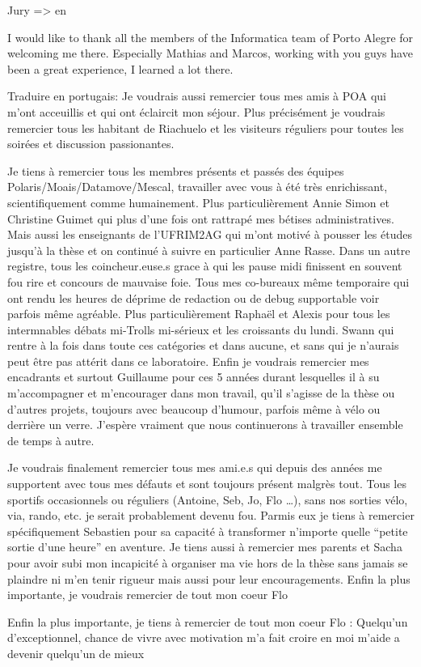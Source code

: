 
Jury => en

I would like to thank all the members of the Informatica team of Porto Alegre for welcoming me there.
Especially Mathias and Marcos, working with you guys have been a great experience, I learned a lot there.

Traduire en portugais:
Je voudrais aussi remercier tous mes amis à POA qui m'ont acceuillis et qui ont éclaircit mon séjour.
Plus précisément je voudrais remercier tous les habitant de Riachuelo et les visiteurs réguliers pour toutes les soirées et discussion passionantes.

Je tiens à remercier tous les membres présents et passés des équipes Polaris/Moais/Datamove/Mescal, travailler avec vous à été très enrichissant, scientifiquement comme humainement.
Plus particulièrement Annie Simon et Christine Guimet qui plus d'une fois ont rattrapé mes bétises administratives.
Mais aussi les enseignants de l'UFRIM2AG qui m'ont motivé à pousser les études jusqu'à la thèse et on continué à suivre en particulier Anne Rasse.
Dans un autre registre, tous les coincheur.euse.s grace à qui les pause midi finissent en souvent fou rire et concours de mauvaise foie.
Tous mes co-bureaux même temporaire qui ont rendu les heures de déprime de redaction ou de debug supportable voir parfois même agréable.
Plus particulièrement Raphaël et Alexis pour tous les intermnables débats mi-Trolls mi-sérieux et les croissants du lundi.
Swann qui rentre à la fois dans toute ces catégories et dans aucune, et sans qui je n'aurais peut être pas attérit dans ce laboratoire.
Enfin je voudrais remercier mes encadrants et surtout Guillaume pour ces 5 années durant lesquelles il à su m'accompagner et m'encourager dans mon travail, qu'il s'agisse de la thèse ou d'autres projets, toujours avec beaucoup d'humour, parfois même à vélo ou derrière un verre.
J'espère vraiment que nous continuerons à travailler ensemble de temps à autre.

Je voudrais finalement remercier tous mes ami.e.s qui depuis des années me supportent avec tous mes défauts et sont toujours présent malgrès tout.
Tous les sportifs occasionnels ou réguliers (Antoine, Seb, Jo, Flo \ldots), sans nos sorties vélo, via, rando, etc. je serait probablement devenu fou.
Parmis eux je tiens à remercier spécifiquement Sebastien pour sa capacité à transformer n'importe quelle “petite sortie d'une heure” en aventure.
Je tiens aussi à remercier mes parents et Sacha pour avoir subi mon incapicité à organiser ma vie hors de la thèse sans jamais se plaindre ni m'en tenir rigueur mais aussi pour leur encouragements.
Enfin la plus importante, je voudrais remercier de tout mon coeur Flo

Enfin la plus importante, je tiens à remercier de tout mon coeur Flo : 
    Quelqu'un d'exceptionnel, chance de vivre avec
    motivation
    m'a fait croire en moi
    m'aide a devenir quelqu'un de mieux


\glsresetall
